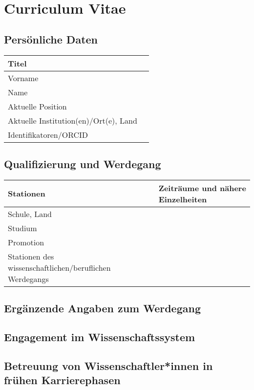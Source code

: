 \documentclass[german, 53.200]{proposal}
\begin{document}
\section*{Curriculum Vitae}

\subsection*{Persönliche Daten}

\begin{tabular}{|>{\raggedright}p{}|p{}|}
\hline
Titel & \\
\hline
Vorname & \\
\hline
Name & \\
\hline
Aktuelle Position &  \\
\hline
Aktuelle Institution(en)/Ort(e), Land & \\
\hline
Identifikatoren/ORCID & \\
\hline
\end{tabular}

\subsection*{Qualifizierung und Werdegang}

\begin{tabular}{|>{\raggedright}p{}|p{}|}
\hline
\textbf{Stationen} & \textbf{Zeiträume und nähere Einzelheiten} \\
\hline
Schule, Land & \\ %
\hline
Studium & \\
\hline
Promotion & \\
\hline
Stationen des wissenschaftlichen/beruflichen Werdegangs & \\ %
\hline
\end{tabular}

\subsection*{Ergänzende Angaben zum Werdegang}

\subsection*{Engagement im Wissenschaftssystem}

\subsection*{Betreuung von Wissenschaftler*innen in frühen Karrierephasen}
\end{document}
